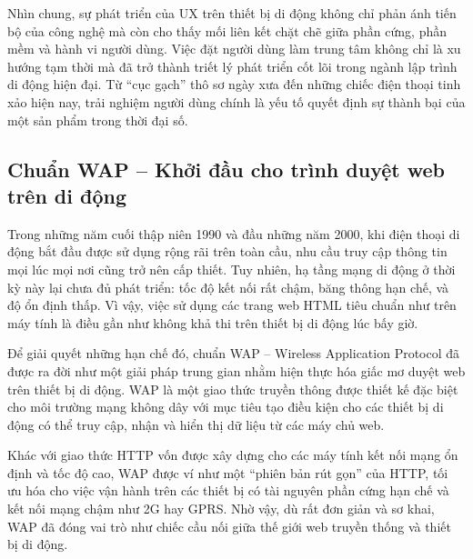   \begin{flushleft}
    \hspace*{0.8cm}Nhìn chung, sự phát triển của UX trên thiết bị di động không chỉ phản ánh tiến bộ của công nghệ mà còn cho thấy mối liên kết chặt chẽ giữa phần cứng, phần mềm và hành vi người dùng. Việc đặt người dùng làm trung tâm không chỉ là xu hướng tạm thời mà đã trở thành triết lý phát triển cốt lõi trong ngành lập trình di động hiện đại. Từ “cục gạch” thô sơ ngày xưa đến những chiếc điện thoại tinh xảo hiện nay, trải nghiệm người dùng chính là yếu tố quyết định sự thành bại của một sản phẩm trong thời đại số.
  \end{flushleft}

\subsection{Chuẩn WAP – Khởi đầu cho trình duyệt web trên di động}
\renewcommand{\labelitemi}{--}    
\begin{flushleft}
  \hspace*{0.8cm}Trong những năm cuối thập niên 1990 và đầu những năm 2000, khi điện thoại di động bắt đầu được sử dụng rộng rãi trên toàn cầu, nhu cầu truy cập thông tin mọi lúc mọi nơi cũng trở nên cấp thiết. Tuy nhiên, hạ tầng mạng di động ở thời kỳ này lại chưa đủ phát triển: tốc độ kết nối rất chậm, băng thông hạn chế, và độ ổn định thấp. Vì vậy, việc sử dụng các trang web HTML tiêu chuẩn như trên máy tính là điều gần như không khả thi trên thiết bị di động lúc bấy giờ.
  \end{flushleft}
  
  \begin{flushleft}
  \hspace*{0.8cm}Để giải quyết những hạn chế đó, chuẩn WAP – Wireless Application Protocol đã được ra đời như một giải pháp trung gian nhằm hiện thực hóa giấc mơ duyệt web trên thiết bị di động. WAP là một giao thức truyền thông được thiết kế đặc biệt cho môi trường mạng không dây với mục tiêu tạo điều kiện cho các thiết bị di động có thể truy cập, nhận và hiển thị dữ liệu từ các máy chủ web.
  \end{flushleft}
  
  \begin{flushleft}
  \hspace*{0.8cm}Khác với giao thức HTTP vốn được xây dựng cho các máy tính kết nối mạng ổn định và tốc độ cao, WAP được ví như một “phiên bản rút gọn” của HTTP, tối ưu hóa cho việc vận hành trên các thiết bị có tài nguyên phần cứng hạn chế và kết nối mạng chậm như 2G hay GPRS. Nhờ vậy, dù rất đơn giản và sơ khai, WAP đã đóng vai trò như chiếc cầu nối giữa thế giới web truyền thống và thiết bị di động.
  \end{flushleft}
  
